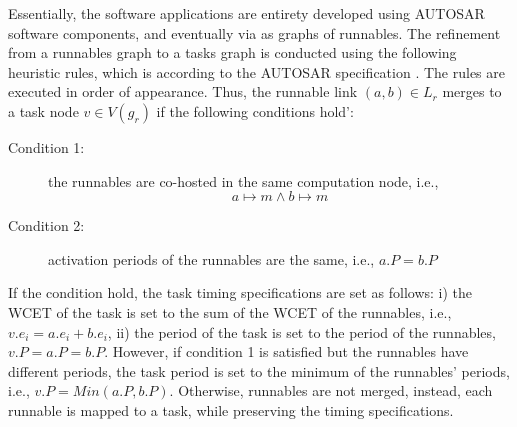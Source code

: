 Essentially, the software applications are entirety developed using AUTOSAR software components, and eventually via as graphs of runnables. The refinement from a runnables graph to a tasks graph is conducted using the following heuristic rules, which is according to the AUTOSAR specification \cite{AUTOSAR2017SpecificationSoftware}. The rules are executed in order of appearance. Thus, the runnable link $(a, b)\in L_r$ merges to a task node $v\in V(g_r)$ if the following conditions hold':
\begin{description}
\item [Condition 1:] the runnables are co-hosted in the same computation node, i.e., \[a\mapsto m \land b\mapsto m\]
\item [Condition 2:] activation periods of the runnables are the same, i.e., $a.P = b.P$
\end{description}

If the condition hold, the task timing specifications are set as follows: i) the WCET of the task is set to the sum of the WCET of the runnables, i.e., $v.e_i=a.e_i + b.e_i$, ii) the period of the task is set to the period of the runnables, $v.P=a.P=b.P$. However, if condition 1 is satisfied but the runnables have different periods, the task period is set to the minimum of the runnables' periods, i.e., $v.P=Min(a.P, b.P)$. Otherwise, runnables are not merged, instead, each runnable is mapped to a task, while preserving the timing specifications.



